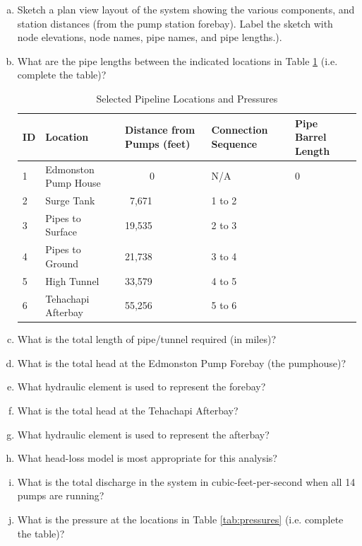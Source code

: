 \documentclass[12pt]{article}
\begin{document}
\begin{enumerate}
    \begin{enumerate}[a)]
\item Sketch a plan view layout of the system showing the various components, and station distances (from the pump station forebay).  Label the sketch with node elevations, node names, pipe names, and pipe lengths.).
\item What are the pipe lengths between the indicated locations in Table \ref{tab:lengths} (i.e. complete the table)?
\begin{table}[h!]
   \centering
    \caption{Selected Pipeline Locations and Pressures }
   \begin{tabular}{p{0.5in}p{1.8in}p{1in}p{1in}p{1in}} %
\hline
\hline
ID & Location & Distance from Pumps (feet) & Connection Sequence & Pipe Barrel Length  \\
\hline
\hline
1& Edmonston Pump House & ~~~~~0  & N/A & 0 \\
\hline
2& Surge Tank & ~7,671 & 1 to 2 & ~~ \\
\hline
3& Pipes to Surface & 19,535 & 2 to 3 & ~~ \\
\hline
4& Pipes to Ground & 21,738 & 3 to 4 & ~~ \\
\hline
5& High Tunnel & 33,579 & 4 to 5 & ~~ \\
\hline
6& Tehachapi Afterbay & 55,256 & 5 to 6 & ~~ \\
\hline
   \end{tabular}
   \label{tab:lengths}
\end{table}
\item What is the total length of pipe/tunnel required (in miles)?
\item What is the total head at the Edmonston Pump Forebay (the pumphouse)?
\item What hydraulic element is used to represent the forebay?
\item What is the total head at the Tehachapi Afterbay?
\item What hydraulic element is used to represent the afterbay?
\item What head-loss model is most appropriate for this analysis?
\item What is the total discharge in the system in cubic-feet-per-second when all 14 pumps are running?
\item What is the pressure at the locations in Table \ref{tab:pressures} (i.e. complete the table)?
\begin{table}[h!]

\end{table}
\end{enumerate}
\end{enumerate}
\end{document}
